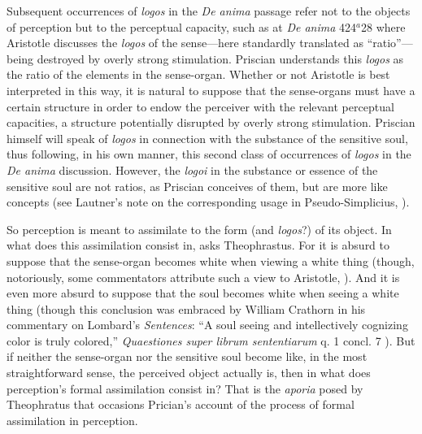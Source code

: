 \documentclass[12pt]{article}
\begin{document}
Subsequent occurrences of \emph{logos} in the \emph{De anima} passage refer not to the objects of perception but to the perceptual capacity, such as at \emph{De anima} 424\( ^{a} \)28 where Aristotle discusses the \emph{logos} of the sense---here standardly translated as ``ratio''---being destroyed by overly strong stimulation. Priscian understands this \emph{logos} as the ratio of the elements in the sense-organ. Whether or not Aristotle is best interpreted in this way, it is natural to suppose that the sense-organs must have a certain structure in order to endow the perceiver with the relevant perceptual capacities, a structure potentially disrupted by overly strong stimulation. Priscian himself will speak of \emph{logos} in connection with the substance of the sensitive soul, thus following, in his own manner, this second class of occurrences of \emph{logos} in the \emph{De anima} discussion. However, the \emph{logoi} in the substance or essence of the sensitive soul are not ratios, as Priscian conceives of them, but are more like concepts (see Lautner's note on the corresponding usage in Pseudo-Simplicius, \citealt[214 n.14]{Sorabji:1997ly}).

So perception is meant to assimilate to the form (and \emph{logos}?) of its object. In what does this assimilation consist in, asks Theophrastus. For it is absurd to suppose that the sense-organ becomes white when viewing a white thing (though, notoriously, some commentators attribute such a view to Aristotle, \citealt{Slakey:1961ss, Sorabji:1974fk,Everson:1997ep}). And it is even more absurd to suppose that the soul becomes white when seeing a white thing (though this conclusion was embraced by William Crathorn in his commentary on Lombard's \emph{Sentences}: ``A soul seeing and intellectively cognizing color is truly colored,'' \emph{Quaestiones super librum sententiarum} q. 1 concl. 7 \citealt[288]{Pasnau:2002pb}). But if neither the sense-organ nor the sensitive soul become like, in the most straightforward sense, the perceived object actually is, then in what does perception's formal assimilation consist in? That is the \emph{aporia} posed by Theophratus that occasions Prician's account of the process of formal assimilation in perception.
\end{document}
